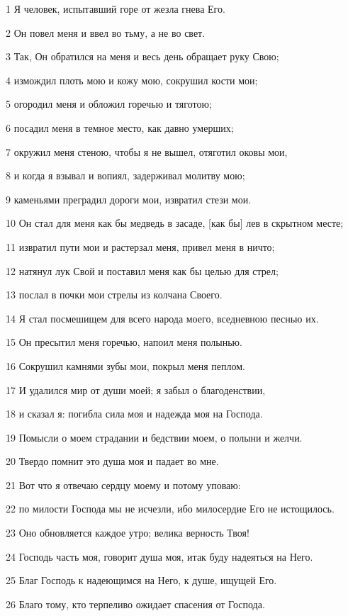 \par 1 Я человек, испытавший горе от жезла гнева Его.
\par 2 Он повел меня и ввел во тьму, а не во свет.
\par 3 Так, Он обратился на меня и весь день обращает руку Свою;
\par 4 измождил плоть мою и кожу мою, сокрушил кости мои;
\par 5 огородил меня и обложил горечью и тяготою;
\par 6 посадил меня в темное место, как давно умерших;
\par 7 окружил меня стеною, чтобы я не вышел, отяготил оковы мои,
\par 8 и когда я взывал и вопиял, задерживал молитву мою;
\par 9 каменьями преградил дороги мои, извратил стези мои.
\par 10 Он стал для меня как бы медведь в засаде, [как бы] лев в скрытном месте;
\par 11 извратил пути мои и растерзал меня, привел меня в ничто;
\par 12 натянул лук Свой и поставил меня как бы целью для стрел;
\par 13 послал в почки мои стрелы из колчана Своего.
\par 14 Я стал посмешищем для всего народа моего, вседневною песнью их.
\par 15 Он пресытил меня горечью, напоил меня полынью.
\par 16 Сокрушил камнями зубы мои, покрыл меня пеплом.
\par 17 И удалился мир от души моей; я забыл о благоденствии,
\par 18 и сказал я: погибла сила моя и надежда моя на Господа.
\par 19 Помысли о моем страдании и бедствии моем, о полыни и желчи.
\par 20 Твердо помнит это душа моя и падает во мне.
\par 21 Вот что я отвечаю сердцу моему и потому уповаю:
\par 22 по милости Господа мы не исчезли, ибо милосердие Его не истощилось.
\par 23 Оно обновляется каждое утро; велика верность Твоя!
\par 24 Господь часть моя, говорит душа моя, итак буду надеяться на Него.
\par 25 Благ Господь к надеющимся на Него, к душе, ищущей Его.
\par 26 Благо тому, кто терпеливо ожидает спасения от Господа.
